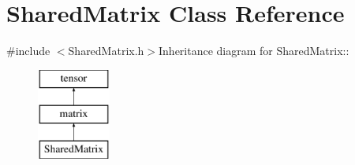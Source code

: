 \hypertarget{classJKBuilder_1_1SharedMatrix}{
\section{SharedMatrix Class Reference}
\label{classJKBuilder_1_1SharedMatrix}
}


{\ttfamily \#include $<$SharedMatrix.h$>$}Inheritance diagram for SharedMatrix::\begin{figure}[H]
\begin{center}
\leavevmode
\includegraphics[height=3cm]{classJKBuilder_1_1SharedMatrix}
\end{center}
\end{figure}

